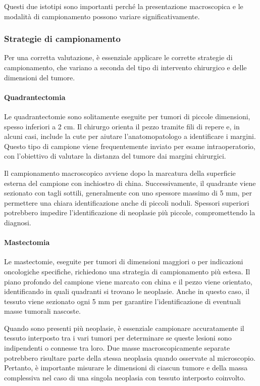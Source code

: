 Questi due istotipi sono importanti perché la presentazione macroscopica e le modalità di campionamento possono variare significativamente.

\subsubsection{Strategie di campionamento}
Per una corretta valutazione, è essenziale applicare le corrette strategie di campionamento, che variano a seconda del tipo di intervento chirurgico e delle dimensioni del tumore.

\paragraph{Quadrantectomia}
Le quadrantectomie sono solitamente eseguite per tumori di piccole dimensioni, spesso inferiori a 2 cm. Il chirurgo orienta il pezzo tramite fili di repere e, in alcuni casi, include la cute per aiutare l'anatomopatologo a identificare i margini. Questo tipo di campione viene frequentemente inviato per esame intraoperatorio, con l’obiettivo di valutare la distanza del tumore dai margini chirurgici.

Il campionamento macroscopico avviene dopo la marcatura della superficie esterna del campione con inchiostro di china. Successivamente, il quadrante viene sezionato con tagli sottili, generalmente con uno spessore massimo di 5 mm, per permettere una chiara identificazione anche di piccoli noduli. Spessori superiori potrebbero impedire l’identificazione di neoplasie più piccole, compromettendo la diagnosi.

\paragraph{Mastectomia}
Le mastectomie, eseguite per tumori di dimensioni maggiori o per indicazioni oncologiche specifiche, richiedono una strategia di campionamento più estesa. Il piano profondo del campione viene marcato con china e il pezzo viene orientato, identificando in quali quadranti si trovano le neoplasie. Anche in questo caso, il tessuto viene sezionato ogni 5 mm per garantire l’identificazione di eventuali masse tumorali nascoste.

Quando sono presenti più neoplasie, è essenziale campionare accuratamente il tessuto interposto tra i vari tumori per determinare se queste lesioni sono indipendenti o connesse tra loro. Due masse macroscopicamente separate potrebbero risultare parte della stessa neoplasia quando osservate al microscopio. Pertanto, è importante misurare le dimensioni di ciascun tumore e della massa complessiva nel caso di una singola neoplasia con tessuto interposto coinvolto.

